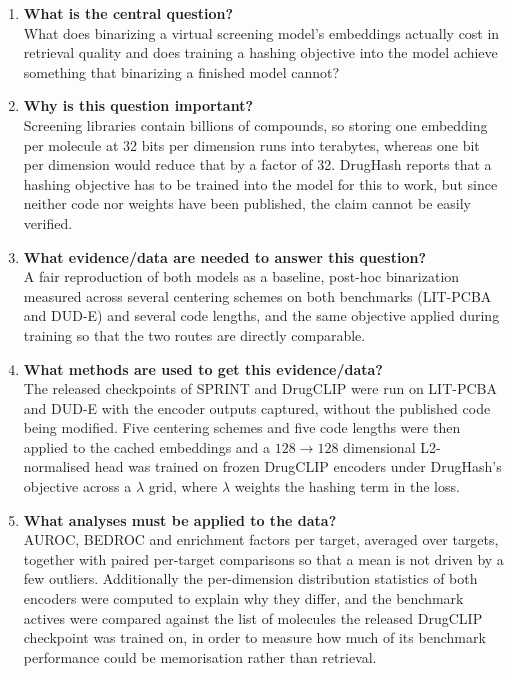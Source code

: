 \documentclass[10pt,a4paper]{article}
\begin{document}
\begin{enumerate}[leftmargin=*]
\item \textbf{What is the central question?}\\
What does binarizing a virtual screening model's embeddings actually cost in retrieval
quality and does training a hashing objective into the model achieve something that
binarizing a finished model cannot?

\item \textbf{Why is this question important?}\\
Screening libraries contain billions of compounds, so storing one embedding per molecule at
32 bits per dimension runs into terabytes, whereas one bit per dimension would reduce that by
a factor of 32. DrugHash reports that a hashing objective has to be trained into the model
for this to work, but since neither code nor weights have been published, the claim cannot be
easily verified.

\item \textbf{What evidence/data are needed to answer this question?}\\
A fair reproduction of both models as a baseline, post-hoc binarization measured across
several centering schemes on both benchmarks (LIT-PCBA and DUD-E) and several code lengths,
and the same objective applied during training so that the two routes are directly
comparable.

\item \textbf{What methods are used to get this evidence/data?}\\
The released checkpoints of SPRINT and DrugCLIP were run on LIT-PCBA and DUD-E with the
encoder outputs captured, without the published code being modified. Five centering schemes
and five code lengths were then applied to the cached embeddings and a $128 \rightarrow 128$
dimensional L2-normalised head was trained on frozen DrugCLIP encoders under DrugHash's
objective across a $\lambda$ grid, where $\lambda$ weights the hashing term in the loss.

\item \textbf{What analyses must be applied to the data?}\\
AUROC, BEDROC and enrichment factors per target, averaged over targets, together with paired
per-target comparisons so that a mean is not driven by a few outliers. Additionally the
per-dimension distribution statistics of both encoders were computed to explain why they
differ, and the benchmark actives were compared against the list of molecules the released
DrugCLIP checkpoint was trained on, in order to measure how much of its benchmark performance
could be memorisation rather than retrieval.


\end{enumerate}
\end{document}
